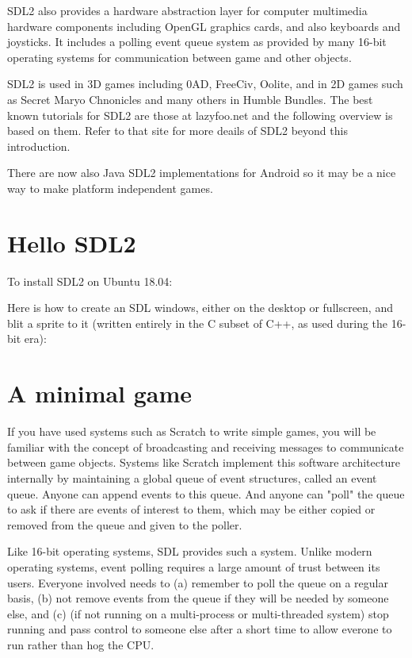 \documentclass[oneside,english]{scrbook}
\begin{document}
SDL2 also provides a hardware abstraction layer for computer multimedia hardware components including OpenGL graphics cards, and also keyboards and joysticks. It includes a polling event queue system as provided by many 16-bit operating systems for communication between game and other objects.  

SDL2 is used in 3D games including 0AD, FreeCiv, Oolite, and in 2D games such as Secret Maryo Chnonicles and many others in Humble Bundles.  The best known tutorials for SDL2 are those at lazyfoo.net and the following overview is based on them. Refer to that site for more deails of SDL2 beyond this introduction.

There are now also Java SDL2 implementations for Android so it may be a nice way to make platform independent games.

\section{Hello SDL2}

To install SDL2 on Ubuntu 18.04:


Here is how to create an SDL windows, either on the desktop or fullscreen, and blit a sprite to it (written entirely in the C subset of C++, as used during the 16-bit era):




\section{A minimal game}
If you have used systems such as Scratch to write simple games, you will be familiar with the concept of broadcasting and receiving messages to communicate between game objects.   Systems like Scratch implement this software architecture internally by maintaining a global queue of event structures, called an event queue.  Anyone can append events to this queue.  And anyone can "poll" the queue to ask if there are events of interest to them, which may be either copied or removed from the queue and given to the poller.  

Like 16-bit operating systems, SDL provides such a system. Unlike modern operating systems, event polling requires a large amount of trust between its users. Everyone involved needs to (a) remember to poll the queue on a regular basis, (b) not remove events from the queue if they will be needed by someone else, and (c) (if not running on a multi-process or multi-threaded system) stop running and pass control to someone else after a short time to allow everone to run rather than hog the CPU.
\end{document}

